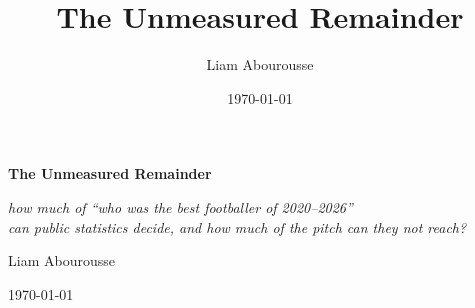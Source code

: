 \documentclass[11pt,a4paper]{article}
\title{The Unmeasured Remainder}
\author{Liam Abourousse}
\date{\today}
\begin{document}
\raggedbottom

\begin{titlepage}
  \centering
  \vspace*{\fill}
  {\LARGE\bfseries The Unmeasured Remainder\par}
  \vspace{1.2em}
  {\large\itshape how much of ``who was the best footballer of 2020--2026''\\
   can public statistics decide, and how much of the pitch can they not reach?\par}
  \vspace{3em}
  {\large Liam Abourousse\par}
  \vspace{0.8em}
  {\large\today\par}
  \vspace*{\fill}
\end{titlepage}
\setcounter{page}{2}
\end{document}
